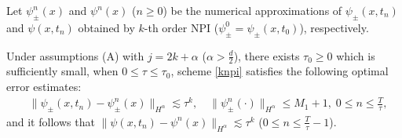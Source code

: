 \documentclass[final,leqno,showlabe]{siamltex}
\begin{document}
Let  $\psi_{\pm}^{n}(x)$ and $\psi^n(x)$ ($n\ge0$) be the numerical approximations of $\psi_\pm(x,t_n)$  and $\psi(x,t_n)$ obtained by $k$-th order NPI ($\psi_\pm^{0}=\psi_\pm(x,t_0)$), respectively.



\begin{theorem}\label{thm:main}
Under assumptions (A) with $j=2k+\alpha$ ($\alpha>\frac{d}{2}$), there exists $\tau_{0}\geq 0$ which is sufficiently small, when $0\leq \tau\leq \tau_{0}$, scheme \eqref{knpi} satisfies the following optimal error estimates:
\begin{align}\label{eq:main}
&\|\psi_{\pm}(x,t_{n})- \psi_{\pm}^{n}(x)\|_{H^{\alpha}}\lesssim\tau^k,\quad \|\psi_{\pm}^n(\cdot)\|_{H^\alpha}\leq M_1+1,\; 0\leq n\leq \frac{T}{\tau},%
\end{align}
and it follows that $\|\psi(x,t_{n})- \psi^{n}(x)\|_{H^{\alpha}} \lesssim \tau^k$ ($0\leq n\leq \frac{T}{\tau}-1$).
\end{theorem}
\end{document}

